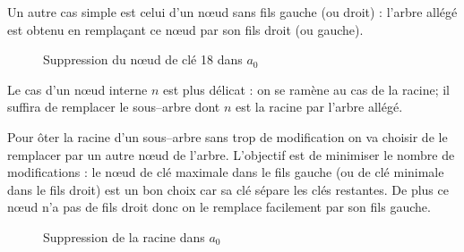 Un autre cas simple est celui d'un nœud sans fils gauche (ou droit) : l'arbre allégé est obtenu en remplaçant ce nœud par son fils droit (ou gauche).
\begin{figure*}[h]
\centering
{}
\caption{Suppression du nœud de clé 18 dans $a_0$}
\end{figure*}

Le cas d'un nœud interne $n$ est plus délicat : on se ramène au cas de la racine; il suffira de remplacer le sous--arbre dont $n$ est la racine par l'arbre allégé.


Pour ôter la racine d'un sous--arbre sans trop de modification on va choisir de le remplacer par un autre nœud de l'arbre. L'objectif est de minimiser le nombre de modifications : le nœud de clé maximale dans le fils gauche (ou de clé minimale dans le fils droit) est un bon choix car sa clé sépare les clés restantes. De plus ce nœud n'a pas de fils droit donc on le remplace facilement par son fils gauche.

\begin{figure*}[h]
\centering
{}
\caption{Suppression de la racine dans $a_0$}
\end{figure*}

